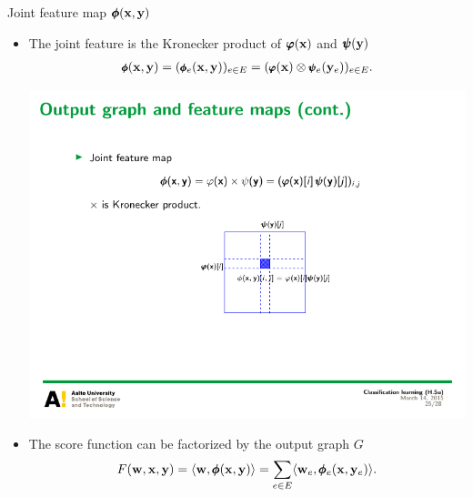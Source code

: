 \documentclass[first=dgreen,second=purple,logo=red]{aaltoslides}
\begin{document}
%
\begin{frame}{Joint feature map $\pmb \phi(\mathbf {x},\mathbf {y})$}
	\begin{itemize}\footnotesize
		\item The joint feature is the Kronecker product of $\pmb \varphi(\mathbf {x})$ and $\pmb \psi(\mathbf {y})$
		\begin{align*}\footnotesize
			\pmb \phi(\mathbf {x},\mathbf {y}) = (\pmb \phi_e(\mathbf {x},\mathbf {y}))_{e\in E}=(\pmb \varphi(\mathbf {x})\otimes\pmb \psi_e(\mathbf {y}_e))_{e\in E}.
		\end{align*}
		\begin{center}
			\includegraphics[scale = 1]{./figures/tensor_label.pdf}
		\end{center}
		\item The score function can be factorized by the output graph $G$
		\begin{align*}
			F(\mathbf {w},\mathbf {x},\mathbf {y}) = \langle \mathbf {w}, \pmb \phi(\mathbf {x},\mathbf {y}) \rangle = \sum_{e\in E}\langle \mathbf {w}_e, \pmb \phi_e(\mathbf {x},\mathbf {y}_e) \rangle.
		\end{align*}
	\end{itemize}
\end{frame}
\end{document}
